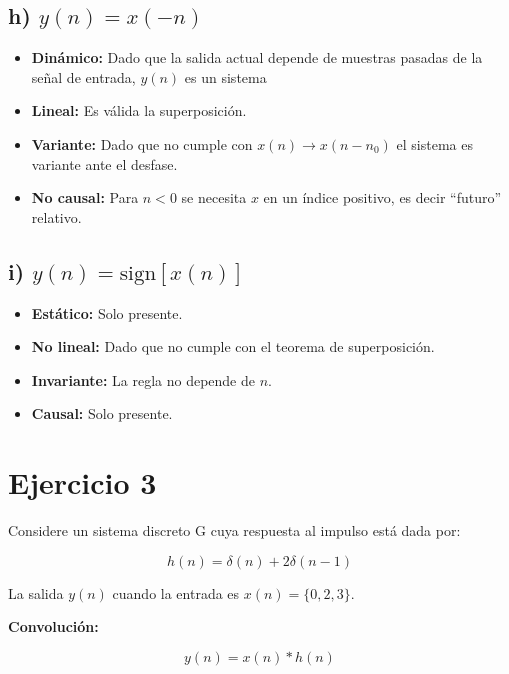 \documentclass[12pt,a4paper]{article}
\begin{document}
\subsection*{h) $y(n) = x(-n)$}

\begin{itemize}
\item \textbf{Dinámico:} Dado que la salida actual depende de muestras pasadas de la señal de entrada, $y(n)$ es un sistema
\item \textbf{Lineal:} Es válida la superposición.
\item \textbf{Variante:} Dado que no cumple con $x(n) \to x(n-n_0)$ el sistema es variante ante el desfase.
\item \textbf{No causal:} Para $n < 0$ se necesita $x$ en un índice positivo, es decir ``futuro'' relativo.
\end{itemize}

\subsection*{i) $y(n) = \text{sign}[x(n)]$}

\begin{itemize}
\item \textbf{Estático:} Solo presente.
\item \textbf{No lineal:} Dado que no cumple con el teorema de superposición.
\item \textbf{Invariante:} La regla no depende de $n$.
\item \textbf{Causal:} Solo presente.
\end{itemize}


\section*{Ejercicio 3}

Considere un sistema discreto G cuya respuesta al impulso está dada por:

\begin{equation}
h(n) = \delta(n) + 2\delta(n-1)
\end{equation}

La salida $y(n)$ cuando la entrada es $x(n) = \{0, 2, 3\}$.

\textbf{Convolución:}

\begin{equation}
y(n) = x(n) * h(n)
\end{equation}
\end{document}

